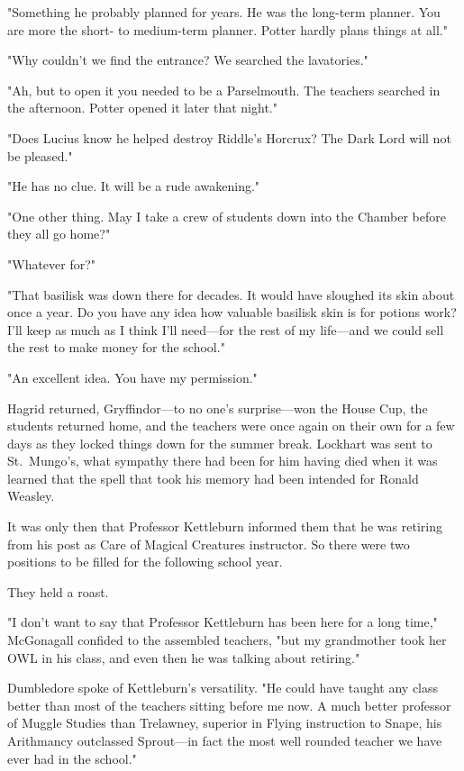 "Something he probably planned for years. He was the long-term planner. You are more the short- to medium-term planner. Potter hardly plans things at all."

"Why couldn't we find the entrance? We searched the lavatories."

"Ah, but to open it you needed to be a Parselmouth. The teachers searched in the afternoon. Potter opened it later that night."

"Does Lucius know he helped destroy Riddle's Horcrux? The Dark Lord will not be pleased."

"He has no clue. It will be a rude awakening."

"One other thing. May I take a crew of students down into the Chamber before they all go home?"

"Whatever for?"

"That basilisk was down there for decades. It would have sloughed its skin about once a year. Do you have any idea how valuable basilisk skin is for potions work? I'll keep as much as I think I'll need—for the rest of my life—and we could sell the rest to make money for the school."

"An excellent idea. You have my permission."

Hagrid returned, Gryffindor—to no one's surprise—won the House Cup, the students returned home, and the teachers were once again on their own for a few days as they locked things down for the summer break. Lockhart was sent to St.~Mungo's, what sympathy there had been for him having died when it was learned that the spell that took his memory had been intended for Ronald Weasley.

It was only then that Professor Kettleburn informed them that he was retiring from his post as Care of Magical Creatures instructor. So there were two positions to be filled for the following school year.

They held a roast.

"I don't want to say that Professor Kettleburn has been here for a long time," McGonagall confided to the assembled teachers, "but my grandmother took her OWL in his class, and even then he was talking about retiring."

Dumbledore spoke of Kettleburn's versatility. "He could have taught any class better than most of the teachers sitting before me now. A much better professor of Muggle Studies than Trelawney, superior in Flying instruction to Snape, his Arithmancy outclassed Sprout—in fact the most well rounded teacher we have ever had in the school."

